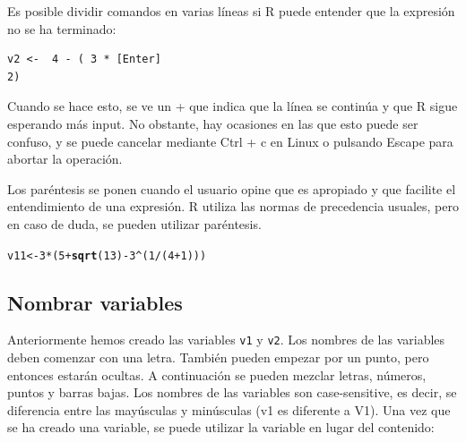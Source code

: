 \documentclass{config/apuntes}\usepackage[]{graphicx}\usepackage[]{xcolor}
\makeatletter
\newcommand{\hlnum}[1]{\textcolor[rgb]{0.686,0.059,0.569}{#1}}%
\newcommand{\hlopt}[1]{\textcolor[rgb]{0,0,0}{#1}}%
\newcommand{\hldef}[1]{\textcolor[rgb]{0.345,0.345,0.345}{#1}}%
\newcommand{\hlkwb}[1]{\textcolor[rgb]{0.69,0.353,0.396}{#1}}%
\newcommand{\hlkwd}[1]{\textcolor[rgb]{0.737,0.353,0.396}{\textbf{#1}}}%
\newenvironment{kframe}{%
 \def\at@end@of@kframe{}%
 \ifinner\ifhmode%
  \def\at@end@of@kframe{\end{minipage}}%
  \begin{minipage}{\columnwidth}%
 \fi\fi%
 \def\FrameCommand##1{\hskip\@totalleftmargin \hskip-\fboxsep
 \colorbox{shadecolor}{##1}\hskip-\fboxsep
     \hskip-\linewidth \hskip-\@totalleftmargin \hskip\columnwidth}%
 \MakeFramed {\advance\hsize-\width
   \@totalleftmargin\z@ \linewidth\hsize
   \@setminipage}}%
 {\par\unskip\endMakeFramed%
 \at@end@of@kframe}
\newenvironment{knitrout}{}{} %
\newcommand{\code}[1]{\texttt{#1}}
\makeatother
\begin{document}
Es posible dividir comandos en varias líneas si R puede entender que la expresión no se ha terminado: 
\begin{verbatim}
v2 <-  4 - ( 3 * [Enter]
2)
\end{verbatim}

Cuando se hace esto, se ve un + que indica que la línea se continúa y que R sigue esperando más input. No obstante, hay ocasiones en las que esto puede ser confuso, y se puede cancelar mediante Ctrl + c en Linux o pulsando Escape para abortar la operación. 

Los paréntesis se ponen cuando el usuario opine que es apropiado y que facilite el entendimiento de una expresión. R utiliza las normas de precedencia usuales, pero en caso de duda, se pueden utilizar paréntesis.

\begin{knitrout}
\color{fgcolor}\begin{kframe}
\begin{alltt}
\hldef{v11} \hlkwb{<-} \hlnum{3} \hlopt{*} \hldef{(} \hlnum{5} \hlopt{+} \hlkwd{sqrt}\hldef{(}\hlnum{13}\hldef{)} \hlopt{-} \hlnum{3}\hlopt{^}\hldef{(}\hlnum{1}\hlopt{/}\hldef{(}\hlnum{4} \hlopt{+} \hlnum{1}\hldef{)))}
\end{alltt}
\end{kframe}
\end{knitrout}

\subsection{Nombrar variables}
Anteriormente hemos creado las variables \code{v1} y \code{v2}. Los nombres de las variables deben comenzar con una letra. También pueden empezar por un punto, pero entonces estarán ocultas. A continuación se pueden mezclar letras, números, puntos y barras bajas. Los nombres de las variables son case-sensitive, es decir, se diferencia entre las mayúsculas y minúsculas (v1 es diferente a V1). Una vez que se ha creado una variable, se puede utilizar la variable en lugar del contenido:
\end{document}
